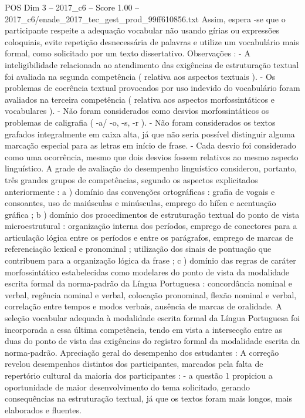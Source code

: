 \begin{textsample}{POS Dim 3 – 2017\_c6 – Score 1.00 – 2017\_c6/enade\_2017\_tec\_gest\_prod\_99ff610856.txt}
Assim, espera -se que o participante respeite a adequação vocabular não usando gírias ou expressões coloquiais, evite repetição desnecessária de palavras e utilize um vocabulário mais formal, como solicitado por um texto dissertativo.
Observações : - A inteligibilidade relacionada ao atendimento das exigências de estruturação textual foi avaliada na segunda competência ( relativa aos aspectos textuais ). - Os problemas de coerência textual provocados por uso indevido do vocabulário foram avaliados na terceira competência ( relativa aos aspectos morfossintáticos e vocabulares ). - Não foram considerados como desvios morfossintáticos os problemas de caligrafia ( -a/ -o, -s, -r ). - Não foram considerados os textos grafados integralmente em caixa alta, já que não seria possível distinguir alguma marcação especial para as letras em início de frase. - Cada desvio foi considerado como uma ocorrência, mesmo que dois desvios fossem relativos ao mesmo aspecto linguístico.
A grade de avaliação do desempenho linguístico considerou, portanto, três grandes grupos de competências, segundo os aspectos explicitados anteriormente : a ) domínio das convenções ortográficas : grafia de vogais e consoantes, uso de maiúsculas e minúsculas, emprego do hífen e acentuação gráfica ; b ) domínio dos procedimentos de estruturação textual do ponto de vista microestrutural : organização interna dos períodos, emprego de conectores para a articulação lógica entre os períodos e entre os parágrafos, emprego de marcas de referenciação lexical e pronominal ; utilização dos sinais de pontuação que contribuem para a organização lógica da frase ; c ) domínio das regras de caráter morfossintático estabelecidas como modelares do ponto de vista da modalidade escrita formal da norma-padrão da Língua Portuguesa : concordância nominal e verbal, regência nominal e verbal, colocação pronominal, flexão nominal e verbal, correlação entre tempos e modos verbais, ausência de marcas de oralidade.
A seleção vocabular adequada à modalidade escrita formal da Língua Portuguesa foi incorporada a essa última competência, tendo em vista a intersecção entre as duas do ponto de vista das exigências do registro formal da modalidade escrita da norma-padrão.
Apreciação geral do desempenho dos estudantes : A correção revelou desempenhos distintos dos participantes, marcados pela falta de repertório cultural da maioria dos participantes : - a questão 1 propiciou a oportunidade de maior desenvolvimento do tema solicitado, gerando consequências na estruturação textual, já que os textos foram mais longos, mais elaborados e fluentes.

\end{textsample}

